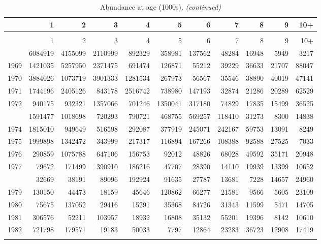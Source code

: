 \documentclass[
]{article}
\begin{document}
\begin{longtable}[t]{lrrrrrrrrrr}
\caption{\label{tab:NAA-table}Abundance at age (1000s).}\\
\toprule
  & 1 & 2 & 3 & 4 & 5 & 6 & 7 & 8 & 9 & 10+\\
\midrule
\endfirsthead
\caption[]{Abundance at age (1000s). \textit{(continued)}}\\
\toprule
  & 1 & 2 & 3 & 4 & 5 & 6 & 7 & 8 & 9 & 10+\\
\midrule
\endhead

\endfoot
\bottomrule
\endlastfoot
1968 & 6084919 & 4155099 & 2110999 & 892329 & 358981 & 137562 & 48284 & 16948 & 5949 & 3217\\
1969 & 1421035 & 5257950 & 2371475 & 691474 & 126871 & 55212 & 39229 & 36633 & 21707 & 88047\\
1970 & 3884026 & 1073719 & 3901333 & 1281534 & 267973 & 56567 & 35546 & 38890 & 40019 & 47141\\
1971 & 1744196 & 2405126 & 843178 & 2516742 & 738980 & 147193 & 32874 & 21286 & 20289 & 62529\\
1972 & 940175 & 932321 & 1357066 & 701246 & 1350041 & 317180 & 74829 & 17835 & 15499 & 36525\\
\addlinespace
1973 & 1591477 & 1018698 & 720293 & 790721 & 468755 & 569257 & 118410 & 31273 & 8300 & 14838\\
1974 & 1815010 & 949649 & 516598 & 292087 & 377919 & 245071 & 242167 & 59753 & 13091 & 8249\\
1975 & 1999898 & 1342472 & 343999 & 217317 & 116894 & 167266 & 108388 & 92588 & 27525 & 7033\\
1976 & 290859 & 1075788 & 647106 & 156753 & 92012 & 48826 & 68028 & 49592 & 35171 & 20948\\
1977 & 79672 & 171499 & 390910 & 186216 & 47707 & 28390 & 14110 & 19939 & 13399 & 10652\\
\addlinespace
1978 & 32669 & 38191 & 89096 & 192924 & 91635 & 27787 & 13681 & 7228 & 14657 & 24960\\
1979 & 130150 & 44473 & 18159 & 45646 & 120862 & 66277 & 21581 & 9566 & 5605 & 23109\\
1980 & 75675 & 137052 & 29416 & 15291 & 35368 & 84726 & 31343 & 11599 & 5471 & 14705\\
1981 & 306576 & 52211 & 103957 & 18932 & 16808 & 35132 & 55201 & 19396 & 8142 & 10610\\
1982 & 721798 & 179571 & 19183 & 50033 & 7797 & 12864 & 23283 & 36723 & 12908 & 17419\\
\addlinespace

\end{longtable}
\end{document}
